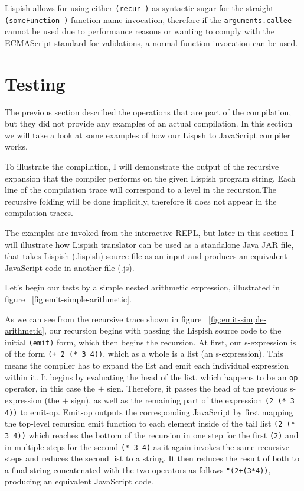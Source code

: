 Lispish allows for using either \texttt{(recur )} as syntactic sugar for the straight \texttt{(someFunction )} function name invocation, therefore if the \texttt{arguments.callee} cannot be used due to performance reasons or wanting to comply with the ECMAScript standard for validations, a normal function invocation can be used.

\section{Testing}
The previous section described the operations that are part of the compilation, but they did not provide any examples of an actual compilation. 
In this section we will take a look at some examples of how our Lispsh to JavaScript compiler works. 

To illustrate the compilation, I will demonstrate the output of the recursive expansion that the compiler performs on the given Lispish program string. 
Each line of the compilation trace will correspond to a level in the recursion.The recursive folding will be done implicitly, therefore it does not appear in the compilation traces. 

The examples are invoked from the interactive REPL, but later in this section I will illustrate how Lispish translator can be used as a standalone Java JAR file, that takes Lispish (.lispish) source file as an input and produces an equivalent JavaScript code in another file (.js).

Let's begin our tests by a simple nested arithmetic expression, illustrated in figure ~\ref{fig:emit-simple-arithmetic}.



As we can see from the recursive trace shown in figure ~\ref{fig:emit-simple-arithmetic}, our recursion begins with passing the Lispish source code to the initial \texttt{(emit)} form, which then begins the recursion.
At first, our s-expression is of the form \texttt{(+ 2 (* 3 4))}, which as a whole is a list (an s-expression). This means the compiler has to expand the list and emit each individual expression within it. It begins by evaluating the head of the list, which happens to be an \texttt{op} operator, in this case the \texttt{$+$} sign. 
Therefore, it passes the head of the previous s-expression (the \texttt{$+$} sign), as well as the remaining part of the expression \texttt{(2 (* 3 4))}  to emit-op. 
Emit-op outputs the corresponding JavaScript by first mapping the top-level recursion emit function to each element inside of the tail list \texttt{(2 (* 3 4))} which reaches the bottom of the recursion in one step for the first \texttt{(2)} and in multiple steps for the second \texttt{(* 3 4)} as it again invokes the same recursive steps and reduces the second list to a string. It then reduces the result of both to a final string concatenated with the two operators as follows \texttt{"(2+(3*4))}, producing an equivalent JavaScript code. 

